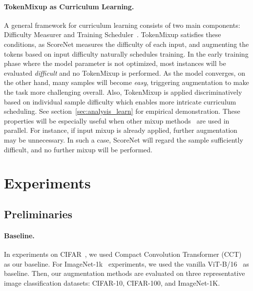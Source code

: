\documentclass{article}
\begin{document}
\paragraph{TokenMixup as Curriculum Learning.}
A general framework for curriculum learning consists of two main components: Difficulty Measurer and Training Scheduler~\cite{wang2021survey}.
TokenMixup satisfies these conditions, as ScoreNet measures the difficulty of each input, and augmenting the tokens based on input difficulty naturally schedules training.
In the early training phase where the model parameter is not optimized, most instances will be evaluated \textit{difficult} and no TokenMixup is performed.
As the model converges, on the other hand, many samples will become \textit{easy}, triggering augmentation to make the task more challenging overall.
Also, TokenMixup is applied discriminatively based on individual sample difficulty which enables more intricate curriculum scheduling.
See section~\ref{sec:analysis_learn} for empirical demonstration.
These properties will be especially useful when other mixup methods~\cite{zhang2017mixup, yun2019cutmix, kim2020puzzle, kim2021co} are used in parallel.
For instance, if input mixup is already applied, further augmentation may be unnecessary.
In such a case, ScoreNet will regard the sample sufficiently difficult, and no further mixup will be performed. 


 

\section{Experiments}
\label{section:experiments}


\subsection{Preliminaries}
\vspace{-2mm}
\paragraph{Baseline.}
In experiments on CIFAR~\cite{krizhevsky2009learning}, we used Compact Convolution Transformer (CCT)~\cite{hassani2021escaping} as our baseline.
For ImageNet-1k~\cite{ILSVRC15} experiments, we used the vanilla ViT-B/16~\cite{dosovitskiy2020image} as baseline.
Then, our augmentation methods are evaluated on three representative image classification datasets: CIFAR-10, CIFAR-100, and ImageNet-1K.

\vspace{-2mm}
\end{document}
